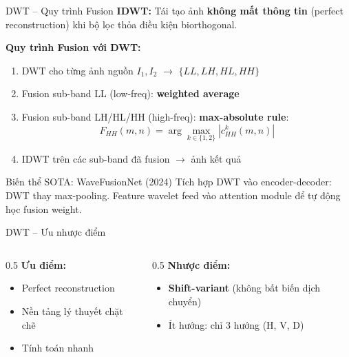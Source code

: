 \documentclass{beamer}
\begin{document}
\begin{frame}{DWT -- Quy trình Fusion}
    \small
    \textbf{IDWT:} Tái tạo ảnh \textbf{không mất thông tin} (perfect reconstruction) khi bộ lọc thỏa điều kiện biorthogonal.

    \vspace{0.15cm}
    \textbf{Quy trình Fusion với DWT:}
    \begin{enumerate}\setlength{\itemsep}{2pt}
        \item DWT cho từng ảnh nguồn $I_1, I_2$ $\to$ $\{LL, LH, HL, HH\}$
        \item Fusion sub-band LL (low-freq): \textbf{weighted average}
        \item Fusion sub-band LH/HL/HH (high-freq): \textbf{max-absolute rule}:
        \vspace{-0.1cm}
        \begin{equation}
            F_{HH}(m,n) = \arg\max_{k \in \{1,2\}} |c_{HH}^k(m,n)|
        \end{equation}
        \vspace{-0.2cm}
        \item IDWT trên các sub-band đã fusion $\to$ ảnh kết quả
    \end{enumerate}

    \vspace{0.1cm}
    \begin{exampleblock}{\footnotesize Biến thể SOTA: WaveFusionNet (2024)}
        \footnotesize Tích hợp DWT vào encoder-decoder: DWT thay max-pooling. Feature wavelet feed vào attention module để tự động học fusion weight.
    \end{exampleblock}
\end{frame}

\begin{frame}{DWT -- Ưu nhược điểm}
    \begin{columns}
        \begin{column}{0.5\textwidth}
            \textbf{Ưu điểm:}
            \begin{itemize}
                \item Perfect reconstruction
                \item Nền tảng lý thuyết chặt chẽ
                \item Tính toán nhanh
            \end{itemize}
        \end{column}
        \begin{column}{0.5\textwidth}
            \textbf{Nhược điểm:}
            \begin{itemize}
                \item \textbf{Shift-variant} (không bất biến dịch chuyển)
                \item Ít hướng: chỉ 3 hướng (H, V, D)
            \end{itemize}
        \end{column}
    \end{columns}
\end{frame}
\end{document}
